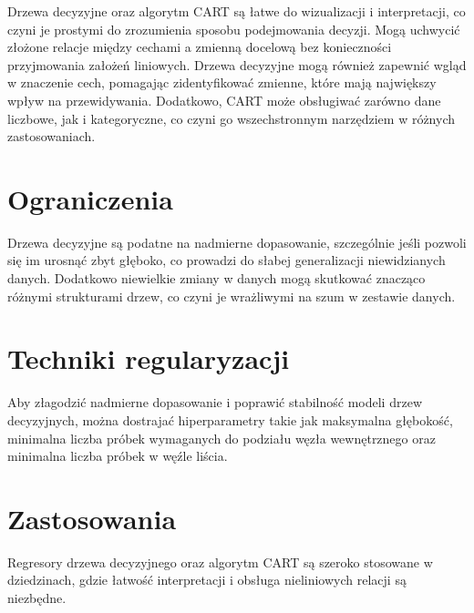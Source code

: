 \hspace{1.5cm} Drzewa decyzyjne oraz algorytm CART są łatwe do wizualizacji i interpretacji, co czyni je prostymi do zrozumienia sposobu podejmowania decyzji. Mogą uchwycić złożone relacje między cechami a zmienną docelową bez konieczności przyjmowania założeń liniowych. Drzewa decyzyjne mogą również zapewnić wgląd w znaczenie cech, pomagając zidentyfikować zmienne, które mają największy wpływ na przewidywania.
Dodatkowo, CART może obsługiwać zarówno dane liczbowe, jak i kategoryczne, co czyni go wszechstronnym narzędziem w różnych zastosowaniach.


{}
\section*{Ograniczenia }
\vspace{-1.0em}

\hspace{1.5cm} Drzewa decyzyjne są podatne na nadmierne dopasowanie, szczególnie jeśli pozwoli się im urosnąć zbyt głęboko, co prowadzi do słabej generalizacji niewidzianych danych. Dodatkowo niewielkie zmiany w danych mogą skutkować znacząco różnymi strukturami drzew, co czyni je wrażliwymi na szum w zestawie danych.

{}
\section*{Techniki regularyzacji \cite{url_DecisionTreeRegressor}}
\vspace{-1.0em}

\hspace{1.5cm} Aby złagodzić nadmierne dopasowanie i poprawić stabilność modeli drzew decyzyjnych, można dostrajać hiperparametry takie jak maksymalna głębokość, minimalna liczba próbek wymaganych do podziału węzła wewnętrznego oraz minimalna liczba próbek w węźle liścia.



{}
\section*{Zastosowania}
\vspace{-0.5em}

Regresory drzewa decyzyjnego oraz algorytm CART są szeroko stosowane w dziedzinach, gdzie łatwość interpretacji i obsługa nieliniowych relacji są niezbędne.

